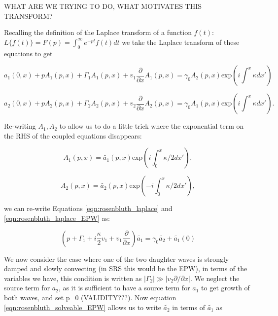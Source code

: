 WHAT ARE WE TRYING TO DO, WHAT MOTIVATES THIS TRANSFORM?

Recalling the definition of the Laplace transform of a function $f(t)$: $L\{f(t)\}= F(p) = \int_0^\infty e^{-pt} f(t) dt$ we take the Laplace transform of these equations to get

\begin{equation}\label{eqn:rosenbluth_laplace}
a_1(0,x) + pA_1(p,x) + \Gamma_1 A_1(p,x) + v_1\frac{\partial}{\partial x}A_1(p,x) = \gamma_0 A_2(p,x)\text{exp}\left(i\int^x \kappa dx'\right)
\end{equation}

\begin{equation}\label{eqn:rosenbluth_laplace_EPW}
a_2(0,x) + pA_2(p,x) + \Gamma_2 A_2(p,x) + v_2\frac{\partial}{\partial x}A_2(p,x) = \gamma_0 A_1(p,x)\text{exp}\left(i\int^x \kappa dx'\right).
\end{equation}

Re-writing $A_1,A_2$ to allow us to do a little trick where the exponential term on the RHS of the coupled equations disappears:  

\begin{equation}
 A_1(p,x) = \tilde{a_1}(p,x)\text{exp}\left(i\int_0^x \kappa/2 dx'\right),
\end{equation}

\begin{equation}\label{eqn:rosenbluth_solveable_EPW}
 A_2(p,x) = \tilde{a_2}(p,x)\text{exp}\left(-i\int_0^x \kappa/2 dx'\right),
\end{equation}

 we can re-write Equations \ref{eqn:rosenbluth_laplace} and \ref{eqn:rosenbluth_laplace_EPW} as:

\begin{equation}
	\left(p + \Gamma_1 + i\frac{\kappa}{2}v_1 + v_1\frac{\partial}{\partial x}\right)\tilde{a_1} = \gamma_0 \tilde{a_2} + \tilde{a_1}(0)
\end{equation}  

We now consider the case where one of the two daughter waves is strongly damped and slowly convecting (in SRS this would be the EPW), in terms of the variables we have, this condition is written as $|\Gamma_2| \gg |v_2\partial / \partial x|$. We neglect the source term for $a_2$, as it is sufficient to have a source term for $a_1$ to get growth of both waves, and set p=0 (VALIDITY???). Now equation \ref{eqn:rosenbluth_solveable_EPW} allows us to write $\tilde{a_2}$ in terms of $\tilde{a_1}$ as

